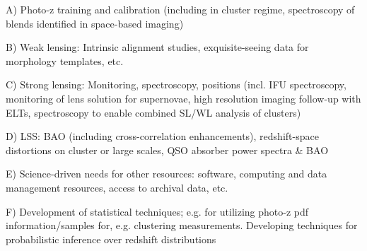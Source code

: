 \documentclass[12pt]{report}
\begin{document}
\pagestyle{fancy}
\fancyfoot{}%
\fancyfoot[R]{\thepage}  %

\fancyhead[R]{}
\renewcommand{\footrulewidth}{1pt}

	A) Photo-z training and calibration (including in cluster regime, spectroscopy of blends identified in space-based imaging)

	B) Weak lensing: Intrinsic alignment studies, exquisite-seeing data for morphology templates, etc.

	C) Strong lensing: Monitoring, spectroscopy, positions (incl. IFU spectroscopy, monitoring of lens solution for supernovae, high resolution imaging follow-up with ELTs, spectroscopy to enable combined SL/WL analysis of clusters)

	D) LSS: BAO (including cross-correlation enhancements), redshift-space distortions on cluster or large scales, QSO absorber power spectra \& BAO

	E) Science-driven needs for other resources: software, computing and data management resources, access to archival data, etc.

F) Development of statistical techniques; e.g. for utilizing photo-z pdf information/samples for, e.g. clustering measurements.  Developing techniques for probabilistic inference over redshift distributions



 

 
\end{document}
